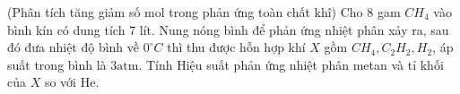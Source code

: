 \begin{vd}
	(Phân tích tăng giảm số mol trong phản ứng toàn chất khî)
	Cho 8 gam $CH_4$ vào bình kín có dung tích 7 lít. Nung nóng bình để phản ứng nhiệt phân xảy ra, sau đó đưa nhiệt độ bình về $0^{\circ} C$ thì thu được hỗn hợp khí $X$ gồm $CH_4, C_2 H_2, H_2$, áp suất trong bình là $3\mathrm{atm}$.
	Tính Hiệu suất phản ứng nhiệt phân metan và tỉ khối của $X$ so với He.
	\loigiai{
	}
\end{vd}

